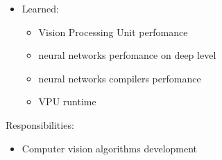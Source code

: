 \documentclass[a4paper,11pt]{memoir}
\newif\ifdetailed
\begin{document}
{\begin{itemize}
\begin{itemize}
		\item creation/development of the framework for pre-silicon validation
		\item ensured all hardware features of VPU are tested on pre-silicon stage
	\end{itemize}
	\item Learned:
	\begin{itemize} 
		\item Vision Processing Unit perfomance
		\item neural networks perfomance on deep level
		\item neural networks compilers perfomance
		\item VPU runtime
	\end{itemize}
\end{itemize}
\fi
}

{
\ifdetailed
Contact info:
\begin{itemize}
	\item Address: Russia, Nizhnii Novgorod, Turgeneva 30
	\item Phone/e-mail: +7 495 641 45 00 / bhr.russia@intel.com
\end{itemize}
\fi
}

{
\ifdetailed
Contact info:
\begin{itemize}
	\item Address: Russia, Krasnodar, Putevaya 11
	\item Phone/e-mail: +7 861 200 95 71 / v.a.feshin@kalashnikovconcern.ru
\end{itemize}
\fi
Responsibilities:
\begin{itemize}
	\item Computer vision algorithms development
\end{itemize}
\ifdetailed
Detailed achievements:
\begin{itemize}
	\item Developed a palms veins pattern matching algorithm for \href{https://en.kalashnikovgroup.ru/media/perspektivnye-razrabotki/kontsern-kalashnikov-predstavil-sobstvennyy-biometricheskiy-skaner}{biometrical \mbox{scanner}}
\end{itemize}
\fi
}

\ifdetailed
\clearpage %
\end{document}

